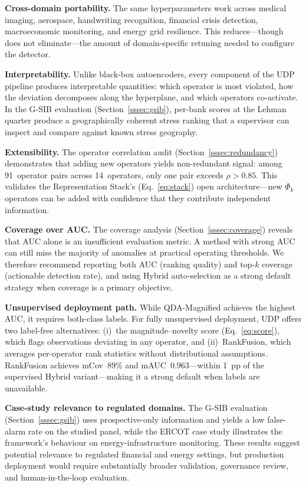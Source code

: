 \documentclass[journal]{IEEEtran}
\begin{document}
\textbf{Cross-domain portability.} The same hyperparameters work across medical imaging, aerospace, handwriting recognition, financial crisis detection, macroeconomic monitoring, and energy grid resilience. This reduces---though does not eliminate---the amount of domain-specific retuning needed to configure the detector.

\textbf{Interpretability.} Unlike black-box autoencoders, every component of the UDP pipeline produces interpretable quantities: which operator is most violated, how the deviation decomposes along the hyperplane, and which operators co-activate.  In the G-SIB evaluation (Section~\ref{sssec:gsib}), per-bank scores at the Lehman quarter produce a geographically coherent stress ranking that a supervisor can inspect and compare against known stress geography.

\textbf{Extensibility.} The operator correlation audit (Section~\ref{sssec:redundancy}) demonstrates that adding new operators yields non-redundant signal: among 91~operator pairs across 14~operators, only one pair exceeds $\rho > 0.85$. This validates the Representation Stack's (Eq.~\eqref{eq:stack}) open architecture---new $\Phi_k$ operators can be added with confidence that they contribute independent information.

\textbf{Coverage over AUC.} The coverage analysis (Section~\ref{sssec:coverage}) reveals that AUC alone is an insufficient evaluation metric. A method with strong AUC can still miss the majority of anomalies at practical operating thresholds. We therefore recommend reporting both AUC (ranking quality) and top-$k$ coverage (actionable detection rate), and using Hybrid auto-selection as a strong default strategy when coverage is a primary objective.

\textbf{Unsupervised deployment path.} While QDA-Magnified achieves the highest AUC, it requires both-class labels. For fully unsupervised deployment, UDP offers two label-free alternatives: (i)~the magnitude--novelty score (Eq.~\eqref{eq:score}), which flags observations deviating in any operator, and (ii)~RankFusion, which averages per-operator rank statistics without distributional assumptions.  RankFusion achieves mCov~89\% and mAUC~0.963---within 1~pp of the supervised Hybrid variant---making it a strong default when labels are unavailable.

\textbf{Case-study relevance to regulated domains.} The G-SIB evaluation (Section~\ref{sssec:gsib}) uses prospective-only information and yields a low false-alarm rate on the studied panel, while the ERCOT case study illustrates the framework's behaviour on energy-infrastructure monitoring.  These results suggest potential relevance to regulated financial and energy settings, but production deployment would require substantially broader validation, governance review, and human-in-the-loop evaluation.
\end{document}
